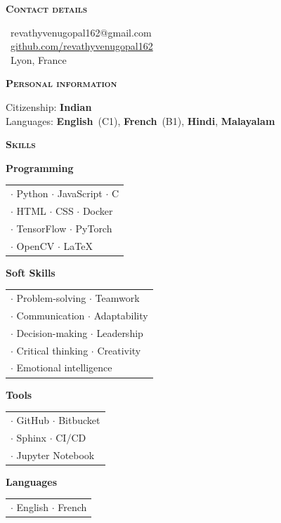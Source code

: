 \documentclass[11pt, a4paper]{article}
\newcommand{\headleft}[1]{\vspace*{3ex}\textsc{\textbf{#1}}\par%
    \vspace*{-1.5ex}\hrulefill\par\vspace*{0.7ex}}
\begin{document}
\begin{minipage}[t]{0.33\textwidth}
{\begin{minipage}[t][293mm][t]{0.82\textwidth}
\headleft{Contact details}
\small %
\MVAt\ {\small revathyvenugopal162@gmail.com} \\[0.4ex]
\Mundus\ \href{https://github.com/Revathyvenugopal162}{github.com/revathyvenugopal162} \\[0.1ex]
\Letter\ Lyon, France
\normalsize

\headleft{Personal information}
Citizenship: \textbf{Indian} \\[0.5ex]
Languages: \textbf{English}~(C1), \textbf{French}~(B1), \textbf{Hindi}, \textbf{Malayalam}
\normalsize

\headleft{Skills}
\small

\vspace{0.5ex}
\textbf{Programming}\\
\vspace{0.5ex}
\begin{tabularx}{\linewidth}{X}
$\cdot$ Python $\cdot$ JavaScript $\cdot$ C \\ $\cdot$ HTML $\cdot$ CSS $\cdot$ Docker \\ $\cdot$ TensorFlow $\cdot$ PyTorch \\ $\cdot$ OpenCV $\cdot$ LaTeX
\end{tabularx}

\vspace{0.5ex}
\textbf{Soft Skills}\\
\vspace{0.5ex}
\begin{tabularx}{\linewidth}{X}
$\cdot$ Problem-solving $\cdot$ Teamwork \\ $\cdot$ Communication $\cdot$ Adaptability \\ $\cdot$ Decision-making $\cdot$ Leadership \\ $\cdot$ Critical thinking $\cdot$ Creativity \\$\cdot$ Emotional intelligence
\end{tabularx}

\vspace{0.5ex}
\textbf{Tools}\\
\vspace{0.5ex}
\begin{tabularx}{\linewidth}{X}
$\cdot$ GitHub $\cdot$ Bitbucket \\ $\cdot$ Sphinx $\cdot$ CI/CD \\ $\cdot$ Jupyter Notebook
\end{tabularx}

\vspace{0.5ex}
\textbf{Languages}\\
\vspace{0.5ex}
\begin{tabularx}{\linewidth}{X}
$\cdot$ English $\cdot$ French
\end{tabularx}

\vspace{1.5ex}


\end{minipage}%
\textwidth\relax%
}
\end{minipage}%
\end{document}
